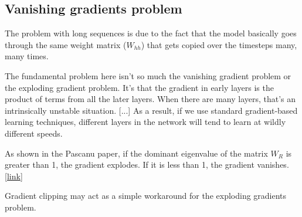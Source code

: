 \documentclass[12pt]{article}
\begin{document}
\subsection{Vanishing gradients problem}
\par The problem with long sequences is due to the fact that the model basically goes through the same weight matrix ($W_{hh}$) that gets copied over the timesteps many, many times.
\par The fundamental problem here isn't so much the vanishing gradient problem or the exploding gradient problem. It's that the gradient in early layers is the product of terms from all the later layers. When there are many layers, that's an intrinsically unstable situation. [...] As a result, if we use standard gradient-based learning techniques, different layers in the network will tend to learn at wildly different speeds.
\par As shown in the Pascanu paper, if the dominant eigenvalue of the matrix $W_R$ is greater than 1, the gradient explodes. If it is less than 1, the gradient vanishes. [\href{https://weberna.github.io/blog/2017/11/15/LSTM-Vanishing-Gradients.html}{link}]
\par Gradient clipping may act as a simple workaround for the exploding gradients problem.
\end{document}

